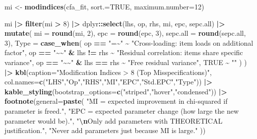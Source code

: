 \documentclass[
]{article}
\newenvironment{Shaded}{\begin{snugshade}}{\end{snugshade}}
\newcommand{\AttributeTok}[1]{\textcolor[rgb]{0.13,0.29,0.53}{#1}}
\newcommand{\ConstantTok}[1]{\textcolor[rgb]{0.56,0.35,0.01}{#1}}
\newcommand{\DecValTok}[1]{\textcolor[rgb]{0.00,0.00,0.81}{#1}}
\newcommand{\FunctionTok}[1]{\textcolor[rgb]{0.13,0.29,0.53}{\textbf{#1}}}
\newcommand{\NormalTok}[1]{#1}
\newcommand{\OtherTok}[1]{\textcolor[rgb]{0.56,0.35,0.01}{#1}}
\newcommand{\SpecialCharTok}[1]{\textcolor[rgb]{0.81,0.36,0.00}{\textbf{#1}}}
\newcommand{\StringTok}[1]{\textcolor[rgb]{0.31,0.60,0.02}{#1}}
\begin{document}
\begin{Shaded}
\begin{Highlighting}[]
\NormalTok{mi }\OtherTok{\textless{}{-}} \FunctionTok{modindices}\NormalTok{(cfa\_fit, }\AttributeTok{sort.=}\ConstantTok{TRUE}\NormalTok{, }\AttributeTok{maximum.number=}\DecValTok{12}\NormalTok{)}

\NormalTok{mi }\SpecialCharTok{|\textgreater{}}
  \FunctionTok{filter}\NormalTok{(mi }\SpecialCharTok{\textgreater{}} \DecValTok{8}\NormalTok{) }\SpecialCharTok{|\textgreater{}}
\NormalTok{  dplyr}\SpecialCharTok{::}\FunctionTok{select}\NormalTok{(lhs, op, rhs, mi, epc, sepc.all) }\SpecialCharTok{|\textgreater{}}
  \FunctionTok{mutate}\NormalTok{(}
    \AttributeTok{mi       =} \FunctionTok{round}\NormalTok{(mi, }\DecValTok{2}\NormalTok{),}
    \AttributeTok{epc      =} \FunctionTok{round}\NormalTok{(epc, }\DecValTok{3}\NormalTok{),}
    \AttributeTok{sepc.all =} \FunctionTok{round}\NormalTok{(sepc.all, }\DecValTok{3}\NormalTok{),}
    \AttributeTok{Type     =} \FunctionTok{case\_when}\NormalTok{(}
\NormalTok{      op }\SpecialCharTok{==} \StringTok{"=\textasciitilde{}"} \SpecialCharTok{\textasciitilde{}} \StringTok{"Cross{-}loading: item loads on additional factor"}\NormalTok{,}
\NormalTok{      op }\SpecialCharTok{==} \StringTok{"\textasciitilde{}\textasciitilde{}"} \SpecialCharTok{\&}\NormalTok{ lhs }\SpecialCharTok{!=}\NormalTok{ rhs }\SpecialCharTok{\textasciitilde{}} \StringTok{"Residual correlation: items share specific variance"}\NormalTok{,}
\NormalTok{      op }\SpecialCharTok{==} \StringTok{"\textasciitilde{}\textasciitilde{}"} \SpecialCharTok{\&}\NormalTok{ lhs }\SpecialCharTok{==}\NormalTok{ rhs }\SpecialCharTok{\textasciitilde{}} \StringTok{"Free residual variance"}\NormalTok{,}
      \ConstantTok{TRUE} \SpecialCharTok{\textasciitilde{}} \StringTok{""}
\NormalTok{    )}
\NormalTok{  ) }\SpecialCharTok{|\textgreater{}}
  \FunctionTok{kbl}\NormalTok{(}\AttributeTok{caption=}\StringTok{"Modification Indices \textgreater{} 8 (Top Misspecifications)"}\NormalTok{,}
      \AttributeTok{col.names=}\FunctionTok{c}\NormalTok{(}\StringTok{"LHS"}\NormalTok{,}\StringTok{"Op"}\NormalTok{,}\StringTok{"RHS"}\NormalTok{,}\StringTok{"MI"}\NormalTok{,}\StringTok{"EPC"}\NormalTok{,}\StringTok{"Std.EPC"}\NormalTok{,}\StringTok{"Type"}\NormalTok{)) }\SpecialCharTok{|\textgreater{}}
  \FunctionTok{kable\_styling}\NormalTok{(}\AttributeTok{bootstrap\_options=}\FunctionTok{c}\NormalTok{(}\StringTok{"striped"}\NormalTok{,}\StringTok{"hover"}\NormalTok{,}\StringTok{"condensed"}\NormalTok{)) }\SpecialCharTok{|\textgreater{}}
  \FunctionTok{footnote}\NormalTok{(}\AttributeTok{general=}\FunctionTok{paste}\NormalTok{(}
    \StringTok{"MI = expected improvement in chi{-}squared if parameter is freed."}\NormalTok{,}
    \StringTok{"EPC = expected parameter change (how large the new parameter would be)."}\NormalTok{,}
    \StringTok{"}\SpecialCharTok{\textbackslash{}n}\StringTok{Only add parameters with THEORETICAL justification."}\NormalTok{,}
    \StringTok{"Never add parameters just because MI is large."}
\NormalTok{  ))}
\end{Highlighting}
\end{Shaded}
\end{document}
